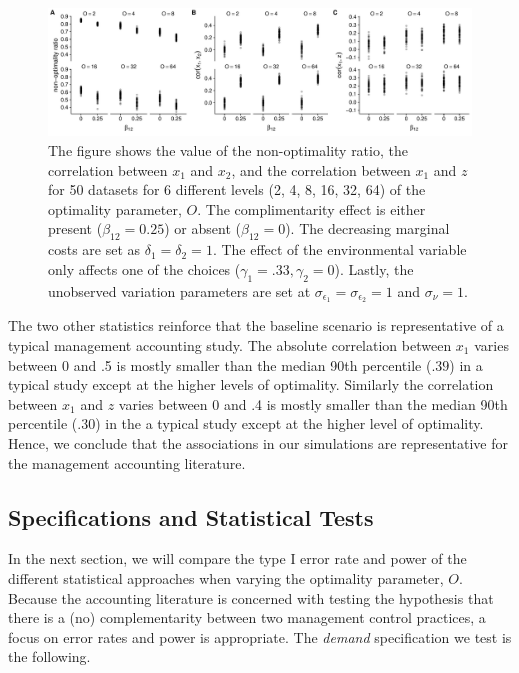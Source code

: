 \documentclass[12pt]{article}
\begin{document}
\begin{figure}
\includegraphics[width=450px]{figure-latex/sample_descriptives.pdf}
\caption[Calibration of Simulated Datasets]{\label{calibration} The figure shows the value of the non-optimality ratio, the correlation between $x_1$ and $x_2$, and the correlation between $x_1$ and $z$ for 50 datasets for 6 different levels (2, 4, 8, 16, 32, 64) of the optimality parameter, $O$. The complimentarity effect is either present ($\beta_{12} = 0.25$) or absent ($\beta_{12} = 0$). The decreasing marginal costs are set as $\delta_1 = \delta_2 = 1$. The effect of the environmental variable only affects one of the choices
($\gamma_1 = .33, \gamma_2 = 0$). Lastly, the unobserved variation parameters are set at $\sigma_{\epsilon_1} = \sigma_{\epsilon_2} = 1$ and $\sigma_{\nu} = 1.$}
\end{figure}

The two other statistics reinforce that the baseline scenario is representative of a typical management accounting study. The absolute correlation between $x_1$ varies between 0 and .5 is mostly smaller than the median 90th percentile ($.39$) in a typical study except at the higher levels of optimality. Similarly the correlation between $x_1$ and $z$ varies between 0 and .4 is mostly smaller than the median 90th percentile (.30) in the a typical study except at the higher level of optimality. Hence, we conclude that the associations in our simulations are representative for the management accounting literature. 

\subsection{Specifications and Statistical Tests}
In the next section, we will compare the type I error rate and power of the different statistical approaches when varying the optimality parameter, \(O\). Because the accounting literature is concerned with testing the hypothesis that there is a (no) complementarity between two management control practices, a focus on error rates and power is appropriate. The \emph{demand} specification we test is the following.
\end{document}
